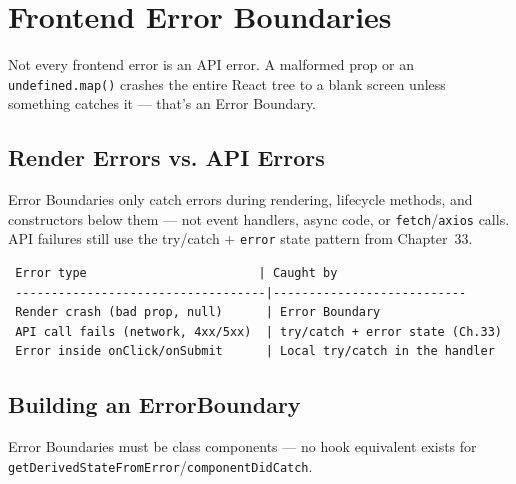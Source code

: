 \chapter{Frontend Error Boundaries}

Not every frontend error is an API error. A malformed prop or an
\texttt{undefined.map()} crashes the entire React tree to a blank screen
unless something catches it --- that's an Error Boundary.

\section{Render Errors vs. API Errors}

\begin{warnbox}[WARNING]
Error Boundaries only catch errors during rendering, lifecycle methods, and
constructors below them --- not event handlers, async code, or
\texttt{fetch}/\texttt{axios} calls. API failures still use the
try/catch + \texttt{error} state pattern from Chapter~33.
\end{warnbox}

\begin{diagrambox}
\begin{verbatim}
 Error type                        | Caught by
 -----------------------------------|---------------------------
 Render crash (bad prop, null)      | Error Boundary
 API call fails (network, 4xx/5xx)  | try/catch + error state (Ch.33)
 Error inside onClick/onSubmit      | Local try/catch in the handler
\end{verbatim}
\end{diagrambox}

\section{Building an ErrorBoundary}

Error Boundaries must be class components --- no hook equivalent exists for
\texttt{getDerivedStateFromError}/\texttt{componentDidCatch}.

